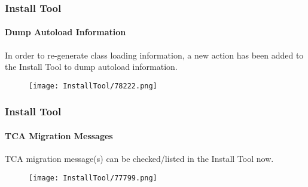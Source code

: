 
\begin{frame}[fragile]
	\frametitle{Install Tool}
	\framesubtitle{Dump Autoload Information}

	In order to re-generate class loading information, a new action has been added
	to the Install Tool to dump autoload information.

	\begin{figure}
		\texttt{[image: InstallTool/78222.png]}
	\end{figure}

\end{frame}


\begin{frame}[fragile]
	\frametitle{Install Tool}
	\framesubtitle{TCA Migration Messages}

	TCA migration message(s) can be checked/listed in the Install Tool now.

	\begin{figure}
		\texttt{[image: InstallTool/77799.png]}
	\end{figure}

\end{frame}


